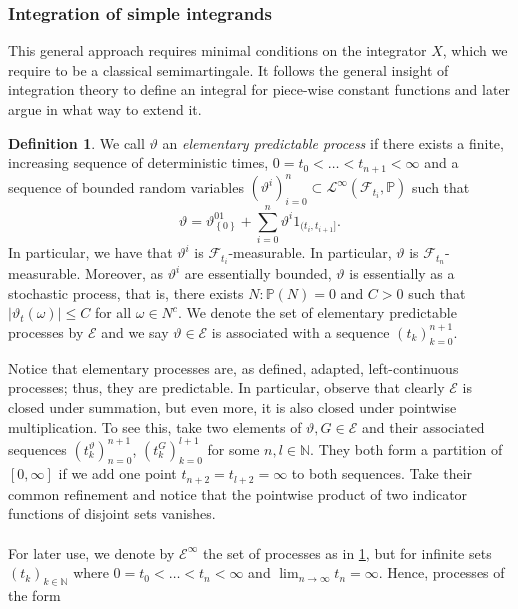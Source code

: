 \documentclass[11pt,a4paper,twoside,openany]{report}
\theoremstyle{plain} %
\theoremstyle{definition} %
\newtheorem{definition}[definition]{Definition}
\theoremstyle{remark} %
\begin{document}
\subsubsection{Integration of simple integrands}
This general approach requires minimal conditions on the integrator \(X\), which we require to be a classical semimartingale. It follows the general insight of integration theory to define an integral for piece-wise constant functions and later argue in what way to extend it. 
\begin{definition}\label{def:elementary predictable process}
    We call \(\vartheta\) an \textit{elementary predictable process} if there exists a finite, increasing sequence of deterministic times, \(0=t_0<\dots<t_{n+1}<\infty\) and a sequence of bounded random variables \((\vartheta^i)_{i=0}^n\subset\mathcal{L}^{\infty}(\mathcal{F}_{t_i},\mathbb{P})\) such that 
    \begin{equation}
        \vartheta = \vartheta^01_{\left\{0\right\}}+\sum_{i=0}^n\vartheta^i1_{(t_i,t_{i+1}]}.
    \end{equation}
In particular, we have that \(\vartheta^i\) is \(\mathcal{F}_{t_i}\)-measurable. In particular, \(\vartheta\) is \(\mathcal{F}_{t_{n}}\)-measurable. Moreover, as \(\vartheta^i\) are essentially bounded, \(\vartheta\) is essentially as a stochastic process, that is, there exists \(N:\mathbb{P}(N)=0\) and \(C>0\) such that \(|\vartheta_t(\omega)|\leq C\) for all \(\omega\in N^c\).  We denote the set of elementary predictable processes by \(\mathcal{E}\) and we say \(\vartheta\in\mathcal{E}\) is associated with a sequence \((t_k)_{k=0}^{n+1}\).
\end{definition}
Notice that elementary processes are, as defined, adapted, left-continuous processes; thus, they are predictable. In particular, observe that clearly \(\mathcal{E}\) is closed under summation, but even more, it is also closed under pointwise multiplication. To see this, take two elements of \(\vartheta,G\in\mathcal{E}\) and their associated sequences \((t^\vartheta_k)_{n=0}^{n+1}\), \((t^G_k)_{k=0}^{l+1}\) for some \(n,l\in\mathbb{N}\). They both form a partition of \([0,\infty]\) if we add one point \(t_{n+2}=t_{l+2}=\infty\) to both sequences. Take their common refinement and notice that the pointwise product of two indicator functions of disjoint sets vanishes.
\\\\
For later use, we denote by \(\mathcal{E}^{\infty}\) the set of processes as in \cref{def:elementary predictable process}, but for infinite sets \((t_k)_{k\in\mathbb{N}}\) where \(0=t_0<\dots<t_n<\infty\) and \(\lim_{n\to\infty}t_n=\infty\). Hence, processes of the form 
\end{document}
